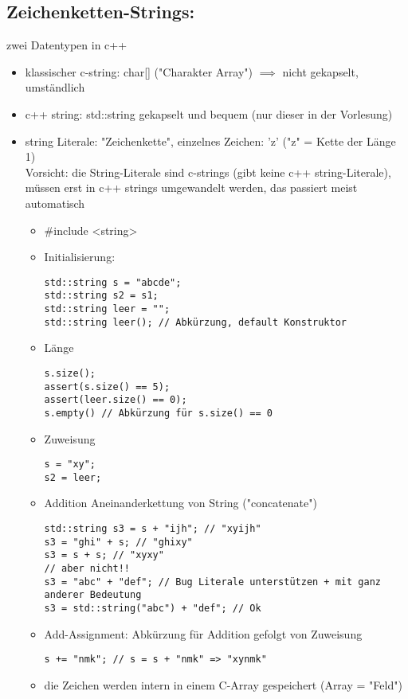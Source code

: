\documentclass[a4paper]{scrartcl}
\theoremstyle{definition}
\theoremstyle{plain}
\theoremstyle{remark}
\theoremstyle{remark}
\begin{document}
\subsection{Zeichenketten-Strings:}
\label{sec-8-3}
zwei Datentypen in c++
\begin{itemize}
\item klassischer c-string: char[] ("Charakter Array") $\implies$ nicht gekapselt, umständlich
\item c++ string: std::string gekapselt und bequem (nur dieser in der Vorlesung)
\item string Literale: "Zeichenkette", einzelnes Zeichen: 'z' ("z" = Kette der Länge 1) \\
     Vorsicht: die String-Literale sind c-strings (gibt keine c++ string-Literale),
müssen erst in c++ strings umgewandelt werden, das passiert meist automatisch
\begin{itemize}
\item \#include <string>
\item Initialisierung:
\begin{verbatim}
std::string s = "abcde";
std::string s2 = s1;
std::string leer = "";
std::string leer(); // Abkürzung, default Konstruktor
\end{verbatim}
\item Länge
\begin{verbatim}
s.size();
assert(s.size() == 5);
assert(leer.size() == 0);
s.empty() // Abkürzung für s.size() == 0
\end{verbatim}
\item Zuweisung
\begin{verbatim}
s = "xy";
s2 = leer;
\end{verbatim}
\item Addition
Aneinanderkettung von String ("concatenate")
\begin{verbatim}
std::string s3 = s + "ijh"; // "xyijh"
s3 = "ghi" + s; // "ghixy"
s3 = s + s; // "xyxy"
// aber nicht!!
s3 = "abc" + "def"; // Bug Literale unterstützen + mit ganz anderer Bedeutung
s3 = std::string("abc") + "def"; // Ok
\end{verbatim}
\item Add-Assignment: Abkürzung für Addition gefolgt von Zuweisung
\begin{verbatim}
s += "nmk"; // s = s + "nmk" => "xynmk"
\end{verbatim}
\item die Zeichen werden intern in einem C-Array gespeichert (Array = "Feld") \\

\end{itemize}
\end{itemize}
\end{document}

